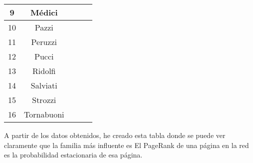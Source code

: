 \begin{center}
\begin{tabular}{|c|c|c|c|c|}
    9 & Médici & \cellcolor{green!25}{0.1320795678121636} & \cellcolor{green!25}{0.14622904976114215} & \cellcolor{green!25}{0.15000147486369722} \\ \hline
    10 & Pazzi & \cellcolor{violet!25}{0.06254850473182186} & \cellcolor{violet!25}{0.06830356213169397} & \cellcolor{violet!25}{0.07062222025284678} \\ \hline
    11 & Peruzzi & \cellcolor{violet!25}{0.0640338188350678} & \cellcolor{violet!25}{0.06509509970488973} & \cellcolor{violet!25}{0.06531503351579934} \\ \hline
    12 & Pucci & \cellcolor{red!25}{0.02031219384756239} & \cellcolor{red!25}{0.00990099009900966} & \cellcolor{red!25}{0.007345642247369766} \\ \hline
    13 & Ridolfi & \cellcolor{yellow!25}{0.05813785531252352} & \cellcolor{yellow!25}{0.05766828706625104} & \cellcolor{yellow!25}{0.05753848456033725} \\ \hline
    14 & Salviati & \cellcolor{blue!25}{0.07857525064488464} & \cellcolor{blue!25}{0.08867479996044474} & \cellcolor{blue!25}{0.09235401457779774} \\ \hline
    15 & Strozzi & \cellcolor{violet!25}{0.06601505333490647} & \cellcolor{violet!25}{0.06716243109855179} & \cellcolor{violet!25}{0.0673885084397732} \\ \hline
    16 & Tornabuoni & \cellcolor{yellow!25}{0.04914701665134973} & \cellcolor{yellow!25}{0.04510411167989654} & \cellcolor{yellow!25}{0.04383755158579216}\\ \hline
\end{tabular}
\end{center}
\par A partir de los datos obtenidos, he creado esta tabla donde se puede ver claramente que la familia más influente es 
El PageRank de una página en la red es la probabilidad estacionaria de esa página.
